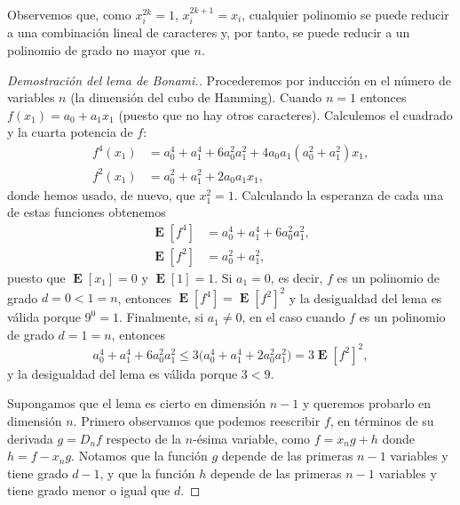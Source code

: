 \documentclass[autocontact]{gaceta}
\DeclareMathOperator{\EE}{\mathbf{E}}
\begin{document}
Observemos que, como $x_i^{2k}=1$, $x_i^{2k+1}=x_i$, cualquier polinomio se puede reducir a una combinación lineal de caracteres y, por tanto, se puede reducir a un polinomio de grado no mayor que $n$.

\begin{proof}[Demostración del lema de Bonami.] Procederemos por inducción en el número de variables $n$ (la dimensión del cubo de Hamming). Cuando $n=1$ entonces $f(x_1)=a_0+a_1x_1$ (puesto que no hay otros caracteres). Calculemos el cuadrado y la cuarta potencia de $f$:
\begin{align*}
   f^4(x_1) &= a_0^4+a_1^4+6a_0^2a_1^2+4a_0a_1(a_0^2+a_1^2)x_1,
   \\
   f^2(x_1) &= a_0^2+a_1^2+2a_0a_1x_1,
\end{align*}
donde hemos usado, de nuevo, que $x_1^2=1$. Calculando la esperanza de cada una de estas funciones obtenemos
\begin{align*}
   \EE[f^4] &= a_0^4+a_1^4+6a_0^2a_1^2,
   \\
   \EE[f^2] &= a_0^2+a_1^2,
\end{align*}
puesto que $\EE[x_1]=0$ y $\EE[1]=1$. Si $a_1=0$, es decir, $f$ es un polinomio de grado $d=0<1=n$, entonces $\EE[f^4]=\EE[f^2]^2$ y la desigualdad del lema es válida porque $9^0=1$. Finalmente, si $a_1\neq 0$, en el caso cuando $f$ es un polinomio de grado $d=1=n$, entonces
\[
a_0^4+a_1^4+6a_0^2a_1^2 \leq 3\big(a_0^4+a_1^4+2a_0^2a_1^2\big)=3\EE[f^2]^2,
\]
y la desigualdad del lema es válida porque $3<9$.

Supongamos que el lema es cierto en dimensión $n-1$ y queremos probarlo en dimensión $n$.
Primero observamos que podemos reescribir $f$, en términos de su derivada $g=D_nf$ respecto de la $n$-ésima variable, como $f=x_ng + h$ donde $h=f-x_ng$. Notamos que la función $g$ depende de las primeras $n-1$ variables y tiene grado $d-1$, y que la función $h$ depende de las primeras $n-1$ variables y tiene grado menor o igual que $d$.


\end{proof}
\end{document}
